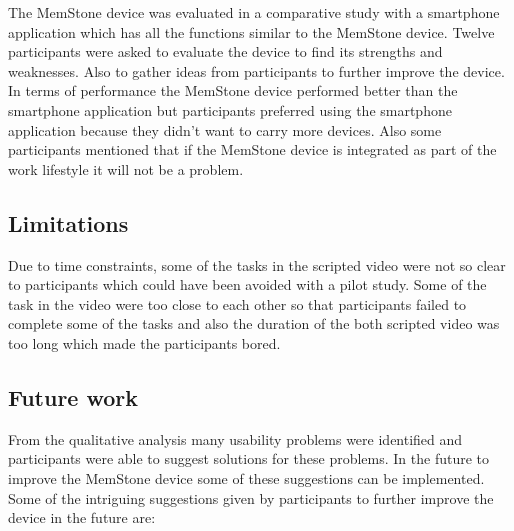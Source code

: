 \documentclass[mscthesis]{usiinfthesis}
\begin{document}
The MemStone device was evaluated in a comparative study with a smartphone application which has all the functions similar to the MemStone device. Twelve participants were asked to evaluate the device to find its strengths and weaknesses. Also to gather ideas from participants to further improve the device. In terms of performance the MemStone device performed better than the smartphone application but participants preferred using the smartphone application because they didn't want to carry more devices. Also some participants mentioned that if the MemStone device is integrated as part of the work lifestyle it will not be a problem. 
\subsection{Limitations}
\label{limit:mt}

Due to time constraints, some of the tasks in the scripted video were not so clear to participants which could have been avoided with a pilot study. Some of the task in the video were too close to each other so that participants failed to complete some of the tasks and also the duration of the both scripted video was too long which made the participants bored. 

\subsection{Future work}
From the qualitative analysis many usability problems were identified and participants were able to suggest solutions for these problems. In the future to improve the MemStone device some of these suggestions can be implemented. Some of the intriguing suggestions given by participants to further improve the device in the future are:
\end{document}
